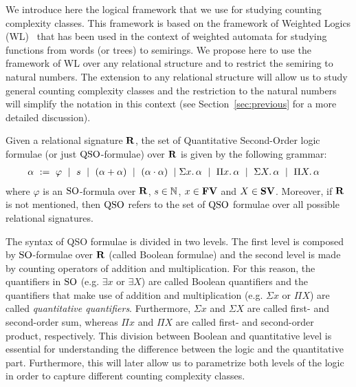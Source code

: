 
We introduce here the logical framework that we use for studying counting complexity classes. 
This framework is based on the framework of Weighted Logics (WL)~\cite{DrosteG07}  that has been used in the context of weighted automata for studying functions from words (or trees) to semirings. 
We propose here to use the framework of WL over any relational structure and to restrict the semiring to natural numbers. 
The extension to any relational structure will allow us to study general counting complexity classes and the restriction to the natural numbers will simplify the notation in this context (see Section~\ref{sec:previous} for a more detailed discussion).

Given a relational signature $\mathbf{R}$, the set of Quantitative Second-Order logic formulae (or just ${\rm QSO}$-formulae) over $\mathbf{R}$ is given by the following grammar:
\begin{align}
\alpha \ &:= \ \varphi \ \mid \ s \ \mid \ (\alpha \add \alpha) \ \mid\ (\alpha \mult \alpha) \ \mid \sa{x} \alpha \ \mid \ \pa{x} \alpha \ \mid \ \sa{X} \alpha \ \mid \ \pa{X} \alpha \label{syntax} 
\end{align}
where $\varphi$ is an ${\rm SO}$-formula over $\mathbf{R}$, $s \in \mathbb{N}$, $x \in \mathbf{FV}$ and $X \in \mathbf{SV}$. Moreover, if $\mathbf{R}$ is not mentioned, then ${\rm QSO}$ refers to the set of ${\rm QSO}$ formulae over all possible relational signatures.

The syntax of QSO formulae is divided in two levels. 
The first level is composed by ${\rm SO}$-formulae over $\mathbf{R}$ (called Boolean formulae) and the second level is made by counting operators of addition and multiplication. 
For this reason, the quantifiers in ${\rm SO}$ (e.g. $\exists x$ or $\exists X$) are called Boolean quantifiers and the quantifiers that make use of addition and multiplication (e.g. $\Sigma x$ or $\Pi X$) are called {\em quantitative quantifiers}.
Furthermore, $\Sigma x$ and $\Sigma X$ are called first- and second-order sum, whereas $\Pi x$ and $\Pi X$ are called first- and second-order product, respectively.
This division between Boolean and quantitative level is essential for understanding the difference between the logic and the quantitative part. 
Furthermore, this will later allow us to parametrize both levels of the logic in order to capture different counting complexity classes.

